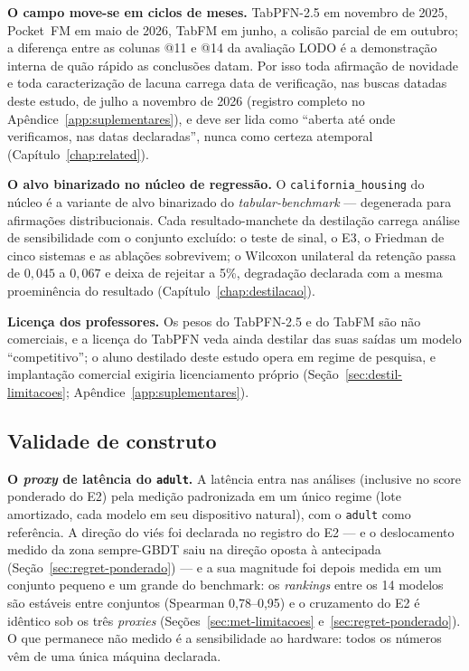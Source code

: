 \textbf{O campo move-se em ciclos de meses.} TabPFN-2.5 em novembro de
2025, Pocket~FM em maio de 2026, TabFM em junho, a colisão parcial de
\citet{jeong2026} em outubro; a diferença entre as colunas @11 e @14
da avaliação LODO é a demonstração interna de quão rápido as conclusões
datam. Por isso toda afirmação de novidade e toda caracterização de
lacuna carrega data de verificação, nas buscas datadas deste estudo,
de julho a novembro de 2026 (registro completo no
Apêndice~\ref{app:suplementares}), e deve ser lida como ``aberta até
onde verificamos, nas datas declaradas'', nunca como certeza atemporal
(Capítulo~\ref{chap:related}).

\textbf{O alvo binarizado no núcleo de regressão.} O
\texttt{california\_\allowbreak housing} do núcleo é a variante de
alvo binarizado do \emph{tabular-benchmark} --- degenerada para
afirmações distribucionais. Cada resultado-manchete da destilação
carrega análise de sensibilidade com o conjunto excluído: o teste de
sinal, o E3, o Friedman de cinco sistemas e as ablações sobrevivem; o
Wilcoxon unilateral da retenção passa de $0{,}045$ a $0{,}067$ e deixa
de rejeitar a 5\%, degradação declarada com a mesma proeminência do
resultado (Capítulo~\ref{chap:destilacao}).

\textbf{Licença dos professores.} Os pesos do TabPFN-2.5 e do TabFM
são não comerciais, e a licença do TabPFN veda ainda destilar das suas
saídas um modelo ``competitivo''; o aluno destilado deste estudo opera
em regime de pesquisa, e implantação comercial exigiria licenciamento
próprio (Seção~\ref{sec:destil-limitacoes};
Apêndice~\ref{app:suplementares}).

\subsection{Validade de construto}

\textbf{O \emph{proxy} de latência do \texttt{adult}.} A latência entra
nas análises (inclusive no score ponderado do E2) pela medição
padronizada em um único regime (lote amortizado, cada modelo em seu
dispositivo natural), com o \texttt{adult} como referência. A direção do
viés foi declarada no registro do E2 --- e o deslocamento medido da
zona sempre-GBDT saiu na direção oposta à antecipada
(Seção~\ref{sec:regret-ponderado}) --- e a sua magnitude foi depois medida
em um conjunto pequeno e um grande do benchmark: os \emph{rankings} entre os 14
modelos são estáveis entre conjuntos (Spearman 0{,}78--0{,}95) e o
cruzamento do E2 é idêntico sob os três \emph{proxies}
(Seções~\ref{sec:met-limitacoes} e~\ref{sec:regret-ponderado}). O que
permanece não medido é a sensibilidade ao hardware: todos os números vêm
de uma única máquina declarada.

